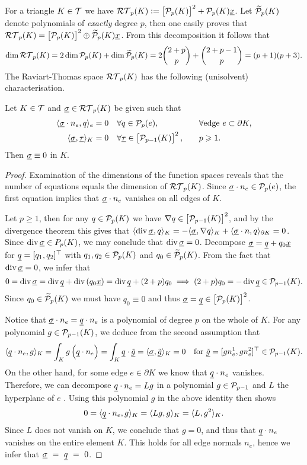 \documentclass[thesis.tex]{subfiles}
\begin{document}
For a triangle $K \in  \T$ we have $\RT_p(K) := \left[ \P_p(K)\right]^2 + \P_p(K)\v{x}$.
Let $\wt \P_p(K)$ denote polynomials of \emph{exactly} degree $p$, then one easily proves that
${\RT_p(K) = \left [\P_p(K)\right]^2 \oplus \wt \P_p(K) \v{x}}$.
From this decomposition it follows that
\[
  \dim{\RT_p(K)} = 2 \dim{\P_p(K)}+ \dim{\wt \P_p(K)} = 2 {2 + p \choose p} + {2 + p - 1 \choose p} = (p+1)(p+3).
\]
The Raviart-Thomas space $\RT_p(K)$ has  the following (unisolvent) characterisation.
\begin{thm}
  \label{thm:rtunisol}
  Let $K \in  \T$ and $\vsig \in \RT_p(K)$ be given such that
  \begin{alignat*}{2}
    \ip{\vsig \cdot n_e, q}_e &= 0 \quad \forall q \in \P_p(e), &&\quad \forall \text{edge } e \subset \partial K,\\
    \ip{\vsig, \vtau}_K &= 0 \quad \forall \vtau \in \left[\P_{p-1}(K)\right]^2, &&\quad p \geq 1.
  \end{alignat*}
  Then $\vsig \equiv 0$ in $K$.
\end{thm}
\begin{proof}
  Examination of the dimensions of the function spaces reveals that the number of equations equals the dimension of $\RT_p(K)$.
  Since $\vsig \cdot n_e \in \P_p(e)$, the first equation implies that $\vsig \cdot n_e$ vanishes on all edges of $K$.

  Let $p \geq 1$, then for any $q \in \P_p(K)$ we have $\nabla q \in \left[\P_{p-1}(K)\right]^2$, and by the divergence theorem this gives that
  $\ip{\div \vsig, q}_K = - \ip{\vsig, \nabla q}_K + \ip{\vsig \cdot n, q}_{\partial K} = 0$. Since $\div \vsig \in P_p(K)$, we
  may conclude that $\div \vsig = 0$.  Decompose $\vsig = \v{q} + q_0\v{x}$ for $\v{q} = [q_1, q_2]^\top$ with $q_1, q_2  \in\P_p(K)$ and $q_0 \in  \wt \P_p(K)$. From the fact that $\div \vsig =0$, we infer that
  \[
    0 = \div \vsig = \div \v{q} + \div \left(q_0 \v{x}\right) = \div \v{q} + (2 + p) q_0 \implies (2 + p) q_0 = - \div \v{q} \in \P_{p-1}(K).
  \]
  Since $q_0 \in \wt \P_p(K)$ we must have $q_0 \equiv 0$ and thus $\vsig = \v{q} \in \left[\P_{p}(K)\right]^2$.

  Notice that $\vsig \cdot n_e = \v{q} \cdot n_e$ is a polynomial of degree $p$  on the whole of $K$.
  For any polynomial $g \in \P_{p-1}(K)$, we deduce from the second assumption that
  \[
    \ip{\v{q} \cdot n_e, g}_K = \int_K g \left(\v{q} \cdot n_e\right) = \int_K \v{q} \cdot \v{\tilde g} = \ip{\vsig, \v{\tilde g}}_K = 0 \quad \text{for } \v{\tilde g} = [g n_e^1, gn_e^2]^\top \in \P_{p-1}(K).
  \]
  On the other hand, for some edge $e \in \partial K$ we know that  $\v{q} \cdot n_e$ vanishes.
  Therefore, we can decompose $\v{q}\cdot n_e = Lg$ in a polynomial $g \in \P_{p-1}$ and $L$ the hyperplane of $e$ \cite[Lem~3.1.10]{brenner}. Using this polynomial $g$ in the above identity then shows
  \[
    0 = \ip{\v{q}\cdot n_e, g}_K = \ip{Lg, g}_K = \ip{L,g^2}_K.
  \]
  Since $L$ does not vanish on $K$, we conclude that $g = 0$, and thus that $\v{q}\cdot n_e$ vanishes
  on the entire element $K$. This holds for all edge  normals $n_e$,  hence we infer that $\vsig~=~\v{q}~=~0$.
\end{proof}
\end{document}
